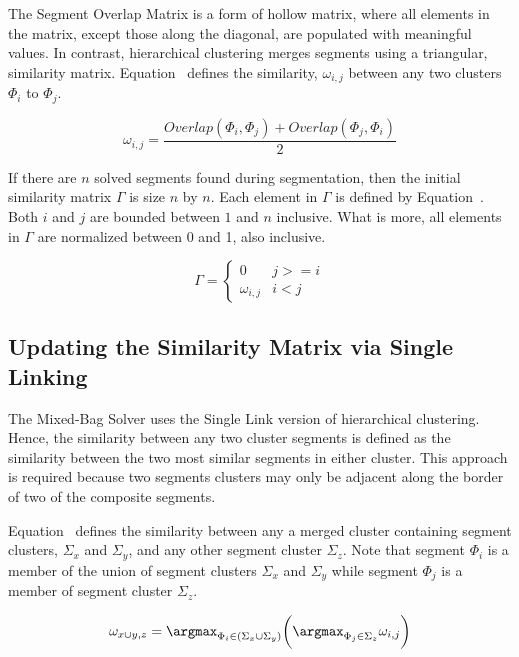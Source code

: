 The Segment Overlap Matrix is a form of hollow matrix, where all elements in the matrix, except those along the diagonal, are populated with meaningful values.  In contrast, hierarchical clustering merges segments using a triangular, similarity matrix.  Equation~ defines the similarity, $\omega_{i,j}$ between any two clusters $\Phi_i$ to $\Phi_j$.

\begin{equation} \label{eq:segmentSimilarity}
\omega_{i,j} = \frac{Overlap(\Phi_i, \Phi_j) + Overlap(\Phi_j, \Phi_i)}{2} 
\end{equation}

If there are $n$ solved segments found during segmentation, then the initial similarity matrix $\Gamma$ is size $n$ by $n$.  Each element in $\Gamma$ is defined by Equation~.  Both $i$ and $j$ are bounded between $1$ and $n$ inclusive.  What is more, all elements in $\Gamma$ are normalized between 0 and 1, also inclusive.

\begin{equation} \label{eq:similarityMatrix}
\Gamma = \begin{cases} 
	0 & j >= i
\\
	\omega_{i,j} & i < j
\end{cases} 
\end{equation}

\subsection{Updating the Similarity Matrix via Single Linking}

The Mixed-Bag Solver uses the Single Link version of hierarchical clustering.  Hence, the similarity between any two cluster segments is defined as the similarity between the two most similar segments in either cluster.  This approach is required because two segments clusters may only be adjacent along the border of two of the composite segments.  

Equation~ defines the similarity between any a merged cluster containing segment clusters, $\Sigma_x$ and $\Sigma_y$, and any other segment cluster $\Sigma_z$.  Note that segment $\Phi_i$ is a member of the union of segment clusters $\Sigma_x$ and $\Sigma_y$ while segment $\Phi_j$ is a member of segment cluster $\Sigma_z$.

\begin{equation} \label{eq:segmentClusterMerge}
	\omega_{x \cup y,z} = \argmax_{\Phi_i \in (\Sigma_x \cup \Sigma_y)} \bigg( \argmax_{\Phi_j \in \Sigma_z} \omega_{i,j} \bigg) 
\end{equation}

